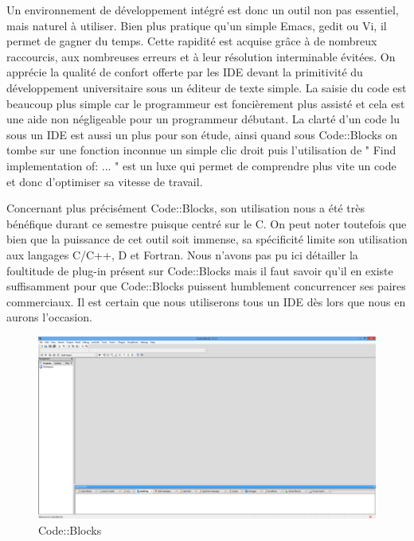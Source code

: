 \documentclass[a4paper, 12pt]{article}
\begin{document}
\begin{doublespace}
Un environnement de développement intégré est donc un outil non pas essentiel, mais naturel à utiliser. Bien plus pratique qu'un simple Emacs, gedit ou Vi, il permet de gagner du temps. Cette rapidité est acquise grâce à de nombreux raccourcis, aux nombreuses erreurs et à leur résolution interminable évitées. On apprécie la qualité de confort offerte par les IDE devant la primitivité du développement universitaire sous un éditeur de texte simple. La saisie du code est beaucoup plus simple car le programmeur est foncièrement plus assisté et cela est une aide non négligeable pour un programmeur débutant. La clarté d'un code lu sous un IDE est aussi un plus pour son étude, ainsi quand sous Code::Blocks on tombe sur une fonction inconnue un simple clic droit puis l'utilisation de " Find implementation of: ... " est un luxe qui permet de comprendre plus vite un code et donc d'optimiser sa vitesse de travail.

	Concernant plus précisément Code::Blocks, son utilisation nous a été très bénéfique durant ce semestre puisque centré sur le C. On peut noter toutefois que bien que la puissance de cet outil soit immense, sa spécificité limite son utilisation aux langages C/C++, D et Fortran. Nous n'avons pas pu ici détailler la foultitude de plug-in présent sur Code::Blocks mais il faut savoir qu'il en existe suffisamment pour que Code::Blocks puissent humblement concurrencer ses paires commerciaux. Il est certain que nous utiliserons tous un IDE dès lors que nous en aurons l'occasion.

\newpage \def\refname{Bibliographie}    

\clearpage \listoffigures {} 
\clearpage
\begin{figure}
\includegraphics[scale=0.3]{./images/cb01.png}
\caption{Code::Blocks}				
\label{cb01}				
\end{figure}


\end{doublespace}
\end{document}
